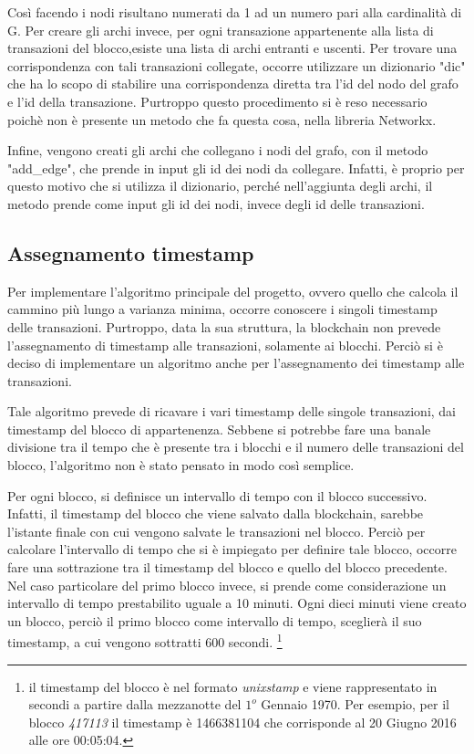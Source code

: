 Così facendo i nodi risultano numerati da 1 ad un numero pari alla cardinalità di G. Per creare gli archi invece, per ogni transazione appartenente alla lista di transazioni del blocco,esiste una lista di archi entranti e uscenti. Per trovare una corrispondenza con tali transazioni collegate, occorre utilizzare un dizionario "dic" che ha lo scopo di stabilire una corrispondenza diretta tra l'id del nodo del grafo e l'id della transazione. Purtroppo questo procedimento si è reso necessario poichè non è presente un metodo che fa questa cosa, nella libreria Networkx.

Infine, vengono creati gli archi che collegano i nodi del grafo, con il metodo "add_edge", che prende in input gli id dei nodi da collegare. Infatti, è proprio per questo motivo che si utilizza il dizionario, perché nell'aggiunta degli archi, il metodo prende come input gli id dei nodi, invece degli id delle transazioni.

\subsection{Assegnamento timestamp}
Per implementare l'algoritmo principale del progetto, ovvero quello che calcola il cammino più lungo a varianza minima, occorre conoscere i singoli timestamp delle transazioni. Purtroppo, data la sua struttura, la blockchain non prevede l'assegnamento di timestamp alle transazioni, solamente ai blocchi. Perciò si è deciso di implementare un algoritmo anche per l'assegnamento dei timestamp alle transazioni.

Tale algoritmo prevede di ricavare i vari timestamp delle singole transazioni, dai timestamp del blocco di appartenenza. Sebbene si potrebbe fare una banale divisione tra il tempo che è presente tra i blocchi e il numero delle transazioni del blocco, l'algoritmo non è stato pensato in modo così semplice.

Per ogni blocco, si definisce un intervallo di tempo con il blocco successivo. Infatti, il timestamp del blocco che viene salvato dalla blockchain, sarebbe l'istante finale con cui vengono salvate le transazioni nel blocco. Perciò per calcolare l'intervallo di tempo che si è impiegato per definire tale blocco, occorre fare una sottrazione tra il timestamp del blocco e quello del blocco precedente. Nel caso particolare del primo blocco invece, si prende come considerazione un intervallo di tempo prestabilito uguale a 10 minuti. Ogni dieci minuti viene creato un blocco, perciò il primo blocco come intervallo di tempo, sceglierà il suo timestamp, a cui vengono sottratti 600 secondi. \footnote{il timestamp del blocco è nel formato \textit{unixstamp} e viene rappresentato in secondi a partire dalla mezzanotte del $1^o$ Gennaio 1970. Per esempio, per il blocco \textit{417113} il timestamp è 1466381104 che corrisponde al 20 Giugno 2016 alle ore 00:05:04.}


